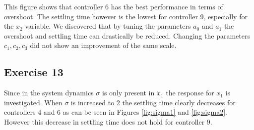 \documentclass[a4paper,12pt]{article}
\begin{document}
This figure shows that controller 6 has the best performance in terms of overshoot. The settling time however is the lowest for controller 9, especially for the $x_2$ variable. We discovered that by tuning the parameters $a_0$ and $a_1$ the overshoot and settling time can drastically be reduced. Changing the parameters $c_1,c_2,c_3$ did not show an improvement of the same scale. 

\subsection{Exercise 13}
Since in the system dynamics $\sigma$ is only present in $\dot{x}_1$ the response for $x_1$ is investigated. When $\sigma$  is increased to 2 the settling time clearly decreases for controllers 4 and 6 as can be seen in Figures \ref{fig:sigma1} and \ref{fig:sigma2}. However this decrease in settling time does not hold for controller 9. 
\end{document}
